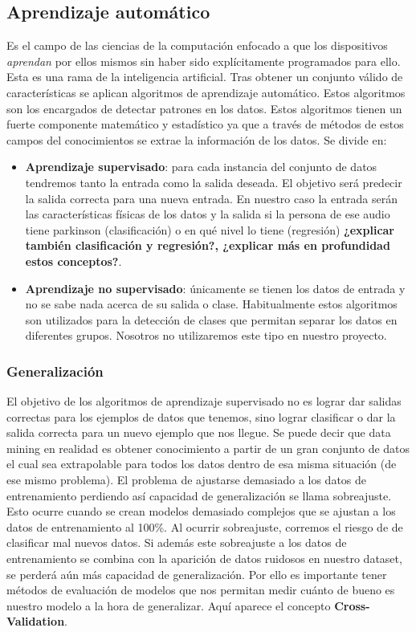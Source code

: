 \subsection{Aprendizaje automático}
Es el campo de las ciencias de la computación enfocado a que los dispositivos \textit{aprendan} por ellos mismos sin haber sido explícitamente programados para ello. Esta es una rama de la inteligencia artificial. Tras obtener un conjunto válido de características se aplican algoritmos de aprendizaje automático. Estos algoritmos son los encargados de detectar patrones en los datos. Estos algoritmos tienen un fuerte componente matemático y estadístico ya que a través de métodos de estos campos del conocimientos se extrae la información de los datos. Se divide en:
\begin{itemize}
	\item \textbf{Aprendizaje supervisado}: para cada instancia del conjunto de datos tendremos tanto la entrada como la salida deseada. El objetivo será predecir la salida correcta para una nueva entrada. En nuestro caso la entrada serán las características físicas de los datos y la salida si la persona de ese audio tiene parkinson (clasificación) o en qué nivel lo tiene (regresión) \textbf{¿explicar también clasificación y regresión?, ¿explicar más en profundidad estos conceptos?}.
	\item \textbf{Aprendizaje no supervisado}: únicamente se tienen los datos de entrada y no se sabe nada acerca de su salida o clase. Habitualmente estos algoritmos son utilizados para la detección de clases que permitan separar los datos en diferentes grupos. Nosotros no utilizaremos este tipo en nuestro proyecto.
\end{itemize}

\subsubsection{Generalización}
El objetivo de los algoritmos de aprendizaje supervisado no es lograr dar salidas correctas para los ejemplos de datos que tenemos, sino lograr clasificar o dar la salida correcta para un nuevo ejemplo que nos llegue. Se puede decir que data mining en realidad es obtener conocimiento a partir de un gran conjunto de datos el cual sea extrapolable para todos los datos dentro de esa misma situación (de ese mismo problema).
El problema de ajustarse demasiado a los datos de entrenamiento perdiendo así capacidad de generalización se llama sobreajuste. Esto ocurre cuando se crean modelos demasiado complejos que se ajustan a los datos de entrenamiento al 100\%. Al ocurrir sobreajuste, corremos el riesgo de de clasificar mal nuevos datos. Si además este sobreajuste a los datos de entrenamiento se combina con la aparición de datos ruidosos en nuestro dataset, se perderá aún más capacidad de generalización. Por ello es importante tener métodos de evaluación de modelos que nos permitan medir cuánto de bueno es nuestro modelo a la hora de generalizar. Aquí aparece el concepto \textbf{Cross-Validation}.

